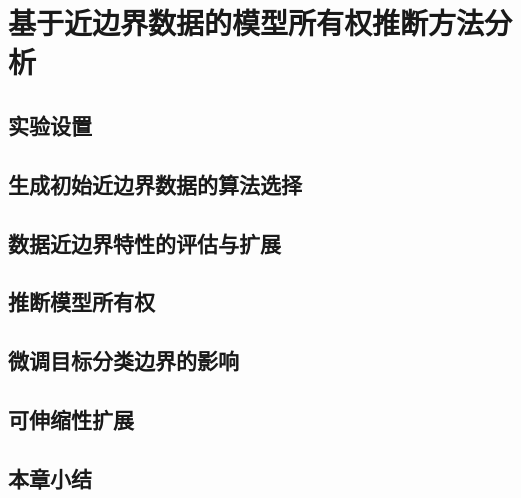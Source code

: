 
\chapter{基于近边界数据的模型所有权推断方法分析}\label{5}



\section{实验设置}\label{5.1}


\section{生成初始近边界数据的算法选择}\label{5.2}

\section{数据近边界特性的评估与扩展}\label{5.3}

\section{推断模型所有权}\label{5.4}

\section{微调目标分类边界的影响}\label{5.5}

\section{可伸缩性扩展}\label{5.6}

\section{本章小结}